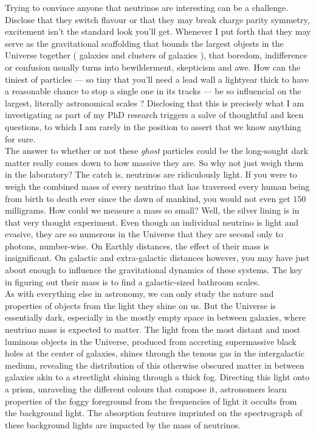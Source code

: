 \begin{intro}
{\color{purple}T}rying to convince anyone that neutrinos are interesting can be a challenge. Disclose that they switch flavour or that they may break charge parity symmetry, excitement isn't the standard look you'll get. Whenever I put forth that they may serve as the gravitational scaffolding that bounds the largest objests in the Universe together ( galaxies and clusters of galaxies ), that boredom, indifference or confusion usually turns into bewilderment, skepticism and awe. How can the tiniest of particles --- so tiny that you'll need a lead wall a lightyear thick to have a reasonable chance to stop a single one in its tracks --- be so influencial on the largest, literally astronomical scales ? Disclosing that this is precisely what I am investigating as part of my PhD research triggers a salve of thoughtful and keen questions, to which I am rarely in the position to assert that we know anything for sure. \\

The answer to whether or not these \textit{ghost} particles could be the long-sought dark matter really comes down to how massive they are. So why not just weigh them in the laboratory? The catch is, neutrinos are ridiculously light. If you were to weigh the combined mass of every neutrino that has traversed every human being from birth to death ever since the dawn of mankind, you would not even get $150$ milligrams. How could we measure a mass so small? Well, the silver lining is in that very thought experiment. Even though an individual neutrino is light and evasive, they are so numerous in the Universe that they are second only to photons, number-wise. On Earthly distances, the effect of their mass is insignificant. On galactic and extra-galactic distances however, you may have just about enough to influence the gravitational dynamics of these systems. The key in figuring out their mass is to find a galactic-sized bathroom scales. \\

As with everything else in astronomy, we can only study the nature and properties of objects from the light they shine on us. But the Universe is essentially dark, especially in the mostly empty space in between galaxies, where neutrino mass is expected to matter. The light from the most distant and most luminous objects in the Universe, produced from accreting supermassive black holes at the center of galaxies, shines through the tenous gas in the intergalactic medium, revealing the distribution of this otherwise obscured matter in between galaxies akin to a streetlight shining through a thick fog. Directing this light onto a prism, unraveling the different colours that compose it, astronomers learn properties of the foggy foreground from the frequencies of light it occults from the background light. The absorption features imprinted on the spectrograph of these background lights are impacted by the mass of neutrinos. \\


\end{intro}
